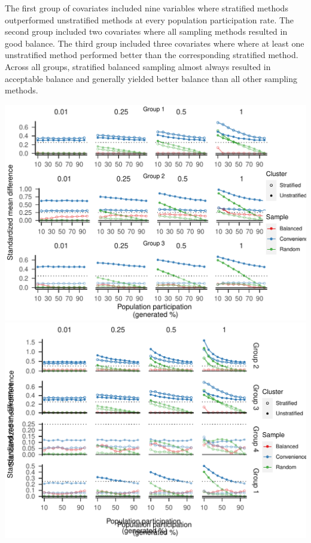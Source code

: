 \documentclass[
  english,
  man,floatsintext]{apa6}
\begin{document}
The first group of covariates included nine variables where stratified methods outperformed unstratified methods at every population participation rate. The second group included two covariates where all sampling methods resulted in good balance. The third group included three covariates where where at least one unstratified method performed better than the corresponding stratified method. Across all groups, stratified balanced sampling almost always resulted in acceptable balance and generally yielded better balance than all other sampling methods.



\includegraphics{6---Paper_files/figure-latex/fig-SMD-groups-1.pdf} \includegraphics{6---Paper_files/figure-latex/fig-SMD-groups-2.pdf}
\end{document}
